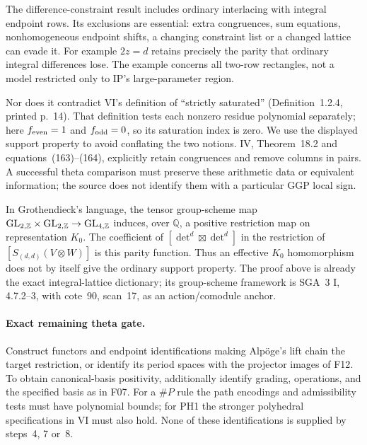 \documentclass[11pt,a4paper]{article}
\newcommand{\Q}{\mathbb Q}\newcommand{\Z}{\mathbb Z}\newcommand{\C}{\mathbb C}\newcommand{\N}{\mathbb N}\newcommand{\F}{\mathbb F}
\newcommand{\fid}[1]{\textsf{#1}}\newcommand{\gate}[1]{\textsf{#1}}
\theoremstyle{named}\newtheorem{finding}{Finding}[section]
\theoremstyle{definition}\newtheorem{definition}[finding]{Definition}
\theoremstyle{remark}\newtheorem{remark}[finding]{Remark}
\begin{document}
The difference-constraint result includes ordinary interlacing with integral endpoint rows. Its exclusions are essential: extra congruences, sum equations, nonhomogeneous endpoint shifts, a changing constraint list or a changed lattice can evade it. For example $2z=d$ retains precisely the parity that ordinary integral differences lose. The example concerns all two-row rectangles, not a model restricted only to IP's large-parameter region.

Nor does it contradict VI's definition of ``strictly saturated'' (Definition~1.2.4, printed p.~14). That definition tests each nonzero residue polynomial separately; here $f_{\rm even}=1$ and $f_{\rm odd}=0$, so its saturation index is zero. We use the displayed support property to avoid conflating the two notions. IV, Theorem~18.2 and equations~(163)--(164), explicitly retain congruences and remove columns in pairs. A successful theta comparison must preserve these arithmetic data or equivalent information; the source does not identify them with a particular GGP local sign.

In Grothendieck's language, the tensor group-scheme map $\GL_{2,\Z}\times\GL_{2,\Z}\to\GL_{4,\Z}$ induces, over $\Q$, a positive restriction map on representation $K_0$. The coefficient of $[\det^d\boxtimes\det^d]$ in the restriction of $[S_{(d,d)}(V\otimes W)]$ is this parity function. Thus an effective $K_0$ homomorphism does not by itself give the ordinary support property. The proof above is already the exact integral-lattice dictionary; its group-scheme framework is SGA~3 I, 4.7.2--3, with cote~90, scan~17, as an action/comodule anchor.

\paragraph{Exact remaining theta gate.}
Construct functors and endpoint identifications making Alp\"oge's lift chain the target restriction, or identify its period spaces with the projector images of \fid{F12}. To obtain canonical-basis positivity, additionally identify grading, operations, and the specified basis as in \fid{F07}. For a \(\#P\) rule the path encodings and admissibility tests must have polynomial bounds; for PH1 the stronger polyhedral specifications in VI must also hold. None of these identifications is supplied by steps~4, 7 or~8.
\end{document}
